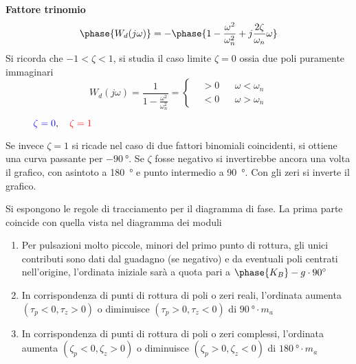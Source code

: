 \newpage
\textbf{Fattore trinomio}
$$
\phase{W_d(j\omega)}  = -
\phase{1-\frac{\omega^2}{\omega_n^2}+j\frac{2\zeta}{\omega_n}\omega}
$$
Si ricorda che $-1<\zeta<1$, si studia il caso limite $\zeta=0$ ossia due poli
puramente immaginari
$$
W_d(j\omega) = \frac{1}{1-\frac{\omega^2}{\omega_n^2}} = \left\{
\begin{aligned}
 &> 0 &  & \omega < \omega_n\\
 &< 0 &  & \omega > \omega_n
\end{aligned}
\right.
$$
\begin{figure}[h]
\centering
{}
\caption{$\textcolor{blue}{\zeta=0},\quad
\textcolor{red}{\zeta=1} $}
\end{figure}

Se invece $\zeta=1$ si ricade nel caso di due fattori binomiali coincidenti,
si ottiene una curva passante per $\SI{-90}{\degree}$.
Se $\zeta$ fosse negativo si invertirebbe ancora una volta il grafico, con
asintoto a \SI{+180}{\degree} e punto intermedio a \SI{+90}{\degree}.
Con gli zeri si inverte il grafico.

Si espongono le regole di tracciamento per il diagramma di fase. La prima parte
coincide con quella vista nel diagramma dei moduli
\begin{enumerate}
 \item Per pulsazioni molto piccole, minori del primo punto di rottura, gli
unici contributi sono dati dal guadagno (se negativo) e da eventuali poli
centrati nell'origine, l'ordinata iniziale sarà a quota pari a $\phase{K_B}
-g\cdot\SI{90}{\degree}$
 \item In corrispondenza di punti di rottura di poli o zeri reali, l'ordinata
aumenta $(\tau_p<0,\tau_z>0)$ o diminuisce $(\tau_p>0,\tau_z<0)$ di
$\SI{90}{\degree}\cdot m_a$
\item In corrispondenza di punti di rottura di poli o zeri complessi,
l'ordinata aumenta $(\zeta_p<0,\zeta_z>0)$ o diminuisce $(\zeta_p>0,\zeta_z<0)$
di $\SI{180}{\degree}\cdot m_a$
\end{enumerate}

